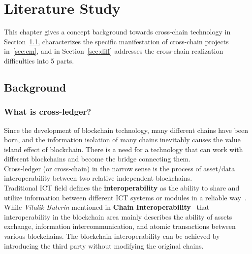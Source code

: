 \chapter{Literature Study} 
\label{chap:2}
\noindent This chapter gives a concept background towards cross-chain technology in Section~\ref{sec:back}, characterizes the specific manifestation of cross-chain projects in~\ref{sec:cm}, and in Section~\ref{sec:diff} addresses the cross-chain realization difficulties into 5 parts.

\section{Background}
\label{sec:back}
\subsection{What is cross-ledger?}
\noindent Since the development of blockchain technology, many different chains have been born, and the information isolation of many chains inevitably causes the value island effect of blockchain. There is a need for a technology that can work with different blockchains and become the bridge connecting them. \\

\noindent Cross-ledger (or cross-chain) in the narrow sense is the process of asset/data interoperability between two relative independent blockchains.\\

\noindent Traditional ICT field defines the \textbf{interoperability} as the ability to share and utilize information between different ICT systems or modules in a reliable way~\cite{osello2015bim}. While \textit{Vitalik Buterin} mentioned in \textbf{Chain Interoperability}~\cite{buterin2016chain} that interoperability in the blockchain area mainly describes the ability of assets exchange, information intercommunication, and atomic transactions between various blockchains. The blockchain interoperability can be achieved by introducing the third party without modifying the original chains.

